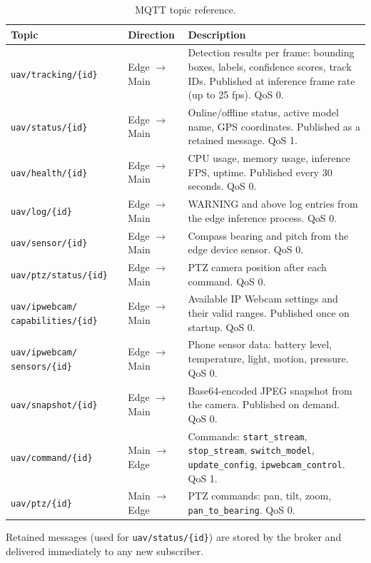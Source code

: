 \documentclass[12pt,a4paper]{report}
\begin{document}
\begin{table}[H]
\centering
\small
\caption{MQTT topic reference.}
\label{tab:mqtt_topics}
\begin{tabular}{|p{4.2cm}|p{2.0cm}|p{6.3cm}|}
\hline
\textbf{Topic} & \textbf{Direction} & \textbf{Description} \\
\hline
\texttt{uav/tracking/\{id\}} & Edge $\to$ Main & Detection results per frame: bounding boxes, labels, confidence scores, track IDs. Published at inference frame rate (up to 25 fps). QoS 0. \\
\hline
\texttt{uav/status/\{id\}} & Edge $\to$ Main & Online/offline status, active model name, GPS coordinates. Published as a retained message. QoS 1. \\
\hline
\texttt{uav/health/\{id\}} & Edge $\to$ Main & CPU usage, memory usage, inference FPS, uptime. Published every 30 seconds. QoS 0. \\
\hline
\texttt{uav/log/\{id\}} & Edge $\to$ Main & WARNING and above log entries from the edge inference process. QoS 0. \\
\hline
\texttt{uav/sensor/\{id\}} & Edge $\to$ Main & Compass bearing and pitch from the edge device sensor. QoS 0. \\
\hline
\texttt{uav/ptz/status/\{id\}} & Edge $\to$ Main & PTZ camera position after each command. QoS 0. \\
\hline
\texttt{uav/ipwebcam/} \texttt{capabilities/\{id\}} & Edge $\to$ Main & Available IP Webcam settings and their valid ranges. Published once on startup. QoS 0. \\
\hline
\texttt{uav/ipwebcam/} \texttt{sensors/\{id\}} & Edge $\to$ Main & Phone sensor data: battery level, temperature, light, motion, pressure. QoS 0. \\
\hline
\texttt{uav/snapshot/\{id\}} & Edge $\to$ Main & Base64-encoded JPEG snapshot from the camera. Published on demand. QoS 0. \\
\hline
\texttt{uav/command/\{id\}} & Main $\to$ Edge & Commands: \texttt{start\_stream}, \texttt{stop\_stream}, \texttt{switch\_model}, \texttt{update\_config}, \texttt{ipwebcam\_control}. QoS 1. \\
\hline
\texttt{uav/ptz/\{id\}} & Main $\to$ Edge & PTZ commands: pan, tilt, zoom, \texttt{pan\_to\_bearing}. QoS 0. \\
\hline
\end{tabular}
\end{table}

Retained messages (used for \texttt{uav/status/\{id\}}) are stored by the
broker and delivered immediately to any new subscriber.
\end{document}
